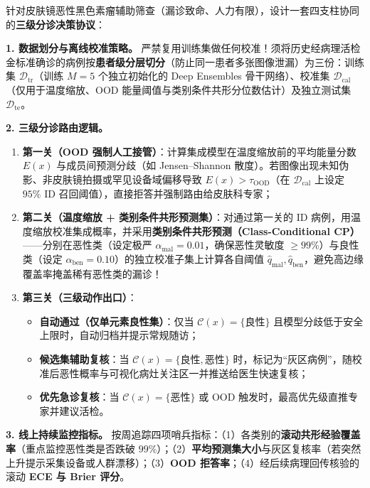 针对皮肤镜恶性黑色素瘤辅助筛查（漏诊致命、人力有限），设计一套四支柱协同的\textbf{三级分诊决策协议}：

\textbf{1. 数据划分与离线校准策略。}
严禁复用训练集做任何校准！须将历史经病理活检金标准确诊的病例按\textbf{患者级分层切分}（防止同一患者多张图像泄漏）为三份：训练集 $\mathcal{D}_{\text{tr}}$（训练 $M = 5$ 个独立初始化的 Deep Ensembles 骨干网络）、校准集 $\mathcal{D}_{\text{cal}}$（仅用于温度缩放、OOD 能量阈值与类别条件共形分位数估计）及独立测试集 $\mathcal{D}_{\text{te}}$。

\textbf{2. 三级分诊路由逻辑。}
\begin{enumerate}
  \item \textbf{第一关（OOD 强制人工接管）}：计算集成模型在温度缩放前的平均能量分数 $E(x)$ 与成员间预测分歧（如 Jensen--Shannon 散度）。若图像出现未知伪影、非皮肤镜拍摄或罕见设备域偏移导致 $E(x) > \tau_{\text{OOD}}$（在 $\mathcal{D}_{\text{cal}}$ 上设定 $95\%$ ID 召回阈值），直接拒答并强制路由给皮肤科专家；
  \item \textbf{第二关（温度缩放 + 类别条件共形预测集）}：对通过第一关的 ID 病例，用温度缩放校准集成概率，并采用\textbf{类别条件共形预测（Class-Conditional CP）}——分别在恶性类（设定极严 $\alpha_{\text{mal}} = 0.01$，确保恶性灵敏度 $\ge 99\%$）与良性类（设定 $\alpha_{\text{ben}} = 0.10$）的独立校准子集上计算各自阈值 $\hat{q}_{\text{mal}}, \hat{q}_{\text{ben}}$，避免高边缘覆盖率掩盖稀有恶性类的漏诊！
  \item \textbf{第三关（三级动作出口）}：
  \begin{itemize}
    \item \textbf{自动通过（仅单元素良性集）}：仅当 $\mathcal{C}(x) = \{\text{良性}\}$ 且模型分歧低于安全上限时，自动归档并提示常规随访；
    \item \textbf{候选集辅助复核}：当 $\mathcal{C}(x) = \{\text{良性}, \text{恶性}\}$ 时，标记为“灰区病例”，随校准后恶性概率与可视化病灶关注区一并推送给医生快速复核；
    \item \textbf{优先急诊复核}：当 $\mathcal{C}(x) = \{\text{恶性}\}$ 或 OOD 触发时，最高优先级直推专家并建议活检。
  \end{itemize}
\end{enumerate}

\textbf{3. 线上持续监控指标。}
按周追踪四项哨兵指标：（1）各类别的\textbf{滚动共形经验覆盖率}（重点监控恶性类是否跌破 $99\%$）；（2）\textbf{平均预测集大小}与灰区复核率（若突然上升提示采集设备或人群漂移）；（3）\textbf{OOD 拒答率}；（4）经后续病理回传核验的滚动 \textbf{ECE 与 Brier 评分}。

